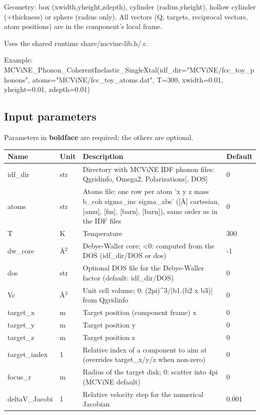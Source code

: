 Geometry: box (xwidth,yheight,zdepth), cylinder (radius,yheight), hollow cylinder (+thickness) or sphere (radius only). All vectors (Q, targets, reciprocal vectors, atom positions) are in the component's local frame.

Uses the shared runtime share/mcvine-lib.h/.c.

Example: MCViNE\_Phonon\_CoherentInelastic\_SingleXtal(idf\_dir="MCViNE/fcc\_toy\_phonons", atoms="MCViNE/fcc\_toy\_atoms.dat", T=300, xwidth=0.01, yheight=0.01, zdepth=0.01)

\subsection*{Input parameters}
Parameters in \textbf{boldface} are required; the others are optional.

\begin{longtable}{p{}p{}p{}p{}}
\toprule
\textbf{Name} & \textbf{Unit} & \textbf{Description} & \textbf{Default} \\
\midrule
\endhead
idf\_dir & str & Directory with MCViNE IDF phonon files: Qgridinfo, Omega2, Polarizations[, DOS] & 0 \\
atoms & str & Atoms file: one row per atom 'x y z mass b\_coh sigma\_inc sigma\_abs' ([\AA{}] cartesian, [amu], [fm], [barn], [barn]), same order as in the IDF files & 0 \\
T & K & Temperature & 300 \\
dw\_core & \AA{}$^{2}$ & Debye-Waller core; \textless{}0: computed from the DOS (idf\_dir/DOS or dos) & -1 \\
dos & str & Optional DOS file for the Debye-Waller factor (default: idf\_dir/DOS) & 0 \\
Vc & \AA{}$^{3}$ & Unit cell volume; 0: (2pi)\textasciicircum{}3/|b1.(b2 x b3)| from Qgridinfo & 0 \\
target\_x & m & Target position (component frame) x & 0 \\
target\_y & m & Target position y & 0 \\
target\_z & m & Target position z & 0 \\
target\_index & 1 & Relative index of a component to aim at (overrides target\_x/y/z when non-zero) & 0 \\
focus\_r & m & Radius of the target disk; 0: scatter into 4pi (MCViNE default) & 0 \\
deltaV\_Jacobi & 1 & Relative velocity step for the numerical Jacobian & 0.001 \\

\end{longtable}

